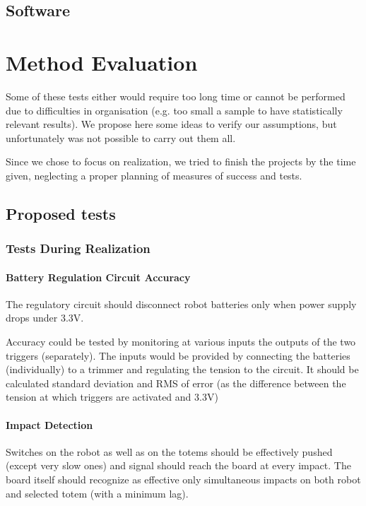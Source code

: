 \documentclass[a4paper,twoside]{book}
\newcommand{\includeDir}{include}
\begin{document}
\section{Software}
\label{sec:software}


\chapter{Method Evaluation}

Some of these tests either would require too long time or cannot be performed due to difficulties in organisation (e.g. too small a sample to have statistically relevant results). We propose here some ideas to verify our assumptions, but unfortunately was not possible to carry out them all.

Since we chose to focus on realization, we tried to finish the projects by the time given, neglecting a proper planning of measures of success and tests.

\section{Proposed tests}

\subsection{Tests During Realization}

\subsubsection*{Battery Regulation Circuit Accuracy}

The regulatory circuit should disconnect robot batteries only when power supply drops under 3.3V.

Accuracy could be tested by monitoring at various inputs the outputs of the two triggers (separately). The inputs would be provided by connecting the batteries (individually) to a trimmer and regulating the tension to the circuit. It should be calculated standard deviation and RMS of error (as the difference between the tension at which triggers are activated and 3.3V)

\subsubsection*{Impact Detection}

Switches on the robot as well as on the totems should be effectively pushed (except very slow ones) and signal should reach the board at every impact.
The board itself should recognize as effective only simultaneous impacts on both robot and selected totem (with a minimum lag).
\end{document}
